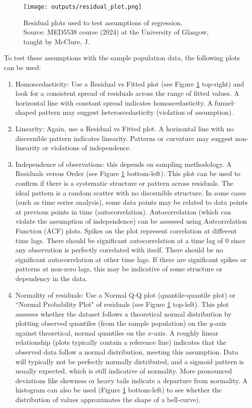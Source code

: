 \documentclass[11pt]{article}
\begin{document}
\begin{figure}
  \centering
  \texttt{[image: outputs/residual\_plot.png]}
  \caption{Residual plots used to test assumptions of regression. \\ Source: MED5538 course (2024) at the University of Glasgow, taught by McClure, J.}
  \label{fig:residual-plots}
\end{figure}
\FloatBarrier  %

To test these assumptions with the sample population data, the following plots can be used:
\begin{enumerate}
    \item Homoscedasticity: Use a Residual vs Fitted plot (see Figure \ref{fig:residual-plots} top-right) and look for a consistent spread of residuals across the range of fitted values. A horizontal line with constant spread indicates homoscedasticity. A funnel-shaped pattern may suggest heteroscedasticity (violation of assumption).
    \item Linearity: Again, use a Residual vs Fitted plot. A horizontal line with no discernible pattern indicates linearity. Patterns or curvature may suggest non-linearity or violations of independence.
    \item Independence of observations: this depends on sampling methodology. A Residuals versus Order (see Figure \ref{fig:residual-plots} bottom-left). This plot can be used to confirm if there is a systematic structure or pattern across residuals. The ideal pattern is a random scatter with no discernible structure. In some cases (such as time series analysis), some data points may be related to data points at previous points in time (autocorrelation). Autocorrelation (which can violate the assumption of independence) can be assessed using Autcorrelation Function (ACF) plots. Spikes on the plot represent correlation at different time lags. There should be significant autocorrelation at a time lag of 0 since any observation is perfectly correlated with itself. There should be no significant autocorrelation at other time lags. If there are significant spikes or patterns at non-zero lags, this may be indicative of some structure or dependency in the data.
    \item Normality of residuals: Use a Normal Q-Q plot (quantile-quantile plot) or ``Normal Probability Plot" of residuals (see Figure \ref{fig:residual-plots} top-left). This  plot assesses whether the dataset follows a theoretical normal distribution by plotting observed quantiles (from the sample population) on the $y$-axis against theoretical, normal quantiles on the $x$-axis. A roughly linear relationship (plots typically contain a reference line) indicates that the observed data follow a normal distribution, meeting this assumption. Data will typically not be perfectly normally distributed, and a sigmoid pattern is usually expected, which is still indicative of normality. More pronounced deviations like skewness or heavy tails indicate a departure from normality. A histogram can also be used (Figure \ref{fig:residual-plots} bottom-left) to see whether the distribution of values approximates the shape of a bell-curve).

\end{enumerate}
\end{document}
